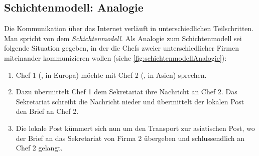 \subsection{Schichtenmodell: Analogie}
Die Kommunikation über das Internet verläuft in unterschiedlichen Teilschritten. Man spricht von dem \textit{Schichtenmodell}. Als Analogie zum Schichtenmodell sei folgende Situation gegeben, in der die Chefs zweier unterschiedlicher Firmen miteinander kommunizieren wollen (siehe \cref{fig:schichtenmodellAnalogie}):
\begin{enumerate}
	\item Chef 1 (\faFemale, in Europa) möchte mit Chef 2 (\faMale, in Asien) sprechen.
	\item Dazu übermittelt Chef 1 dem Sekretariat ihre Nachricht an Chef 2. Das Sekretariat schreibt die Nachricht nieder und übermittelt der lokalen Post den Brief an Chef 2.
	\item Die lokale Post kümmert sich nun um den Transport zur asiatischen Post, wo der Brief an das Sekretariat von Firma 2 übergeben und schlussendlich an Chef 2 gelangt.
\end{enumerate}

